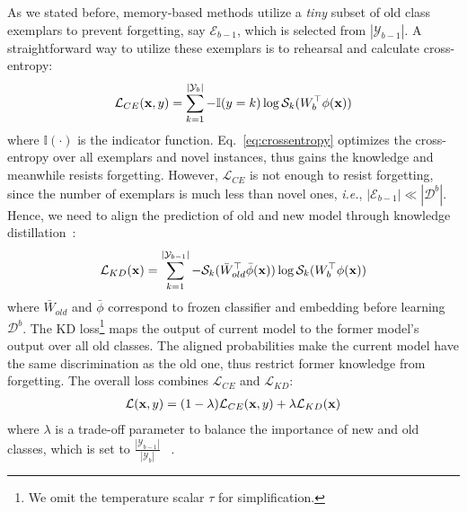 \documentclass[sigconf]{acmart}
\newcommand{\x}{{\bf x}}
\newcommand{\D}{\mathcal{D}}
\newcommand{\Y}{\mathcal{Y}}
\newcommand{\ie}{\emph{i.e.}}
\begin{document}
As we stated before, memory-based methods utilize a \emph{tiny} subset of old class exemplars to prevent forgetting, say $\mathcal{E}_{b-1}$, which is selected from $|\mathcal{Y}_{b-1}|$. A straightforward way to utilize these exemplars is to rehearsal and calculate cross-entropy:
\begin{align} \label{eq:crossentropy} 
	\mathcal{L}_{C E}(\mathbf{x}, y)=	 \sum_{k=1}^{|\mathcal{Y}_b|}-\mathbb{I}(y=k) \log \mathcal{S}_k(W_{b}^{\top}\phi(\x))
\end{align}
where $\mathbb{I}(\cdot)$ is the indicator function. Eq.~\ref{eq:crossentropy} optimizes the cross-entropy over all exemplars and novel instances, thus gains the knowledge and meanwhile resists forgetting.
However, $\mathcal{L}_{C E}$ is not enough to resist  forgetting, since the number of exemplars is much less than novel ones, \ie, $|\mathcal{E}_{b-1}| \ll |\D^b|$.
Hence, we need to align the prediction of old  and new model  through knowledge distillation~\cite{hinton2015distilling}:
\begin{align} \label{eq:kd}
	\mathcal{L}_{KD}(\mathbf{x}) =  \sum_{k=1}^{|\mathcal{Y}_{b-1}|}-
	\mathcal{S}_k(\bar{W}_{old}^{\top}\bar{\phi}(\x))
	\log \mathcal{S}_k(W_{b}^{\top}\phi(\x)) 
\end{align}
where $\bar{W}_{old}$ and $\bar{\phi}$ correspond to frozen classifier and embedding before learning $\D^b$.
The KD loss\footnote{We omit the temperature scalar $\tau$ for simplification. } maps the output of current model to the former model's output over all old classes. 
The aligned probabilities make the current model have  the same  discrimination as the old one, thus restrict former knowledge from forgetting. 
The overall loss combines $\mathcal{L}_{CE}$ and $\mathcal{L}_{KD}$:
\begin{align} \label{eq:icarl}
	\mathcal{L}(\x, y)=(1-\lambda) \mathcal{L}_{CE}(\x, y)+\lambda \mathcal{L}_{KD}(\x)
\end{align}
where $\lambda$ is a trade-off parameter to balance the importance of new and old classes, which is set to $\frac{|\Y_{b-1}|}{|\Y_b|}$ ~\cite{wu2019large}.
\end{document}
